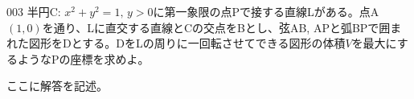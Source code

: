 \begin{thm}{003}{}{}
 半円C: $x^2+y^2=1,\, y>0$に第一象限の点Pで接する直線Lがある。点A$(1,0)$を通り、Lに直交する直線とCの交点をBとし、弦AB, APと弧BPで囲まれた図形をDとする。DをLの周りに一回転させてできる図形の体積$V$を最大にするようなPの座標を求めよ。
\end{thm}

ここに解答を記述。
